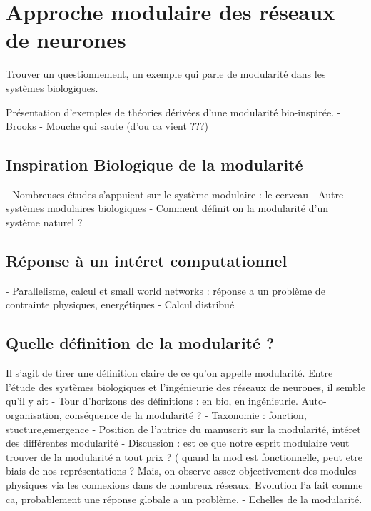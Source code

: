 \chapter{Approche modulaire des réseaux de neurones}
Trouver un questionnement, un exemple qui parle de modularité dans les systèmes biologiques.

Présentation d'exemples de théories dérivées d'une modularité bio-inspirée. 
- Brooks
- Mouche qui saute (d'ou ca vient ???)

\section{Inspiration Biologique de la modularité}

- Nombreuses études s'appuient sur le système modulaire : le cerveau
- Autre systèmes modulaires biologiques
- Comment définit on la modularité d'un système naturel ? 

\section{Réponse à un intéret computationnel}

- Parallelisme, calcul et small world networks : réponse a un problème de contrainte physiques, energétiques
- Calcul distribué 

\section{Quelle définition de la modularité ?}

Il s'agit de tirer une définition claire de ce qu'on appelle modularité. Entre l'étude des systèmes biologiques et l'ingénieurie des réseaux de neurones, il semble qu'il y ait
- Tour d'horizons des définitions : en bio, en ingénieurie. Auto-organisation, conséquence de la modularité ? 
- Taxonomie : fonction, stucture,emergence 
- Position de l'autrice du manuscrit sur la modularité, intéret des différentes modularité
- Discussion : est ce que notre esprit modulaire veut trouver de la modularité a tout prix ? ( quand la mod est fonctionnelle, peut etre biais de nos représentations ? Mais, on observe assez objectivement des modules physiques via les connexions dans de nombreux réseaux. Evolution l'a fait comme ca, probablement une réponse globale a un problème. 
- Echelles de la modularité. 


